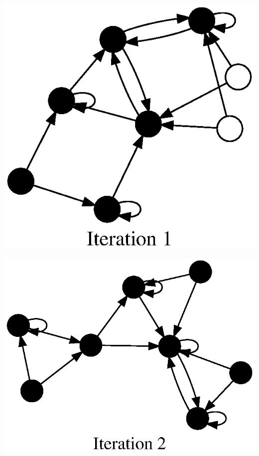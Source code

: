 \documentclass{tufte-handout}
\begin{document}
\begin{marginfigure}
\hspace{-4em}
\includegraphics{5iters_1.ps}
\end{marginfigure}

\begin{marginfigure}
\hspace{-4em}
\includegraphics{5iters_2.ps}
\end{marginfigure}
\end{document}
